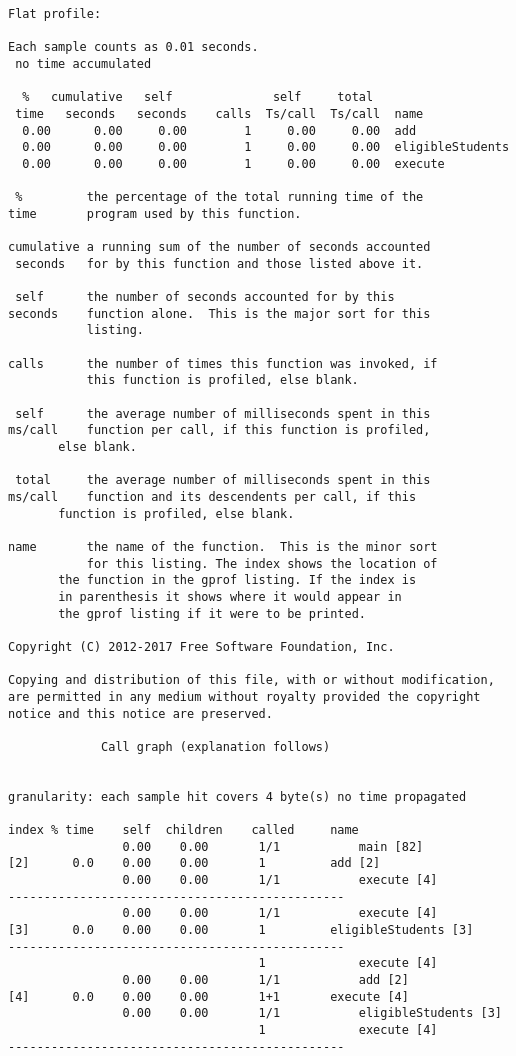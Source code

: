 \documentclass{report}
\begin{document}
\begin{verbatim}
Flat profile:

Each sample counts as 0.01 seconds.
 no time accumulated

  %   cumulative   self              self     total           
 time   seconds   seconds    calls  Ts/call  Ts/call  name    
  0.00      0.00     0.00        1     0.00     0.00  add
  0.00      0.00     0.00        1     0.00     0.00  eligibleStudents
  0.00      0.00     0.00        1     0.00     0.00  execute

 %         the percentage of the total running time of the
time       program used by this function.

cumulative a running sum of the number of seconds accounted
 seconds   for by this function and those listed above it.

 self      the number of seconds accounted for by this
seconds    function alone.  This is the major sort for this
           listing.

calls      the number of times this function was invoked, if
           this function is profiled, else blank.

 self      the average number of milliseconds spent in this
ms/call    function per call, if this function is profiled,
	   else blank.

 total     the average number of milliseconds spent in this
ms/call    function and its descendents per call, if this
	   function is profiled, else blank.

name       the name of the function.  This is the minor sort
           for this listing. The index shows the location of
	   the function in the gprof listing. If the index is
	   in parenthesis it shows where it would appear in
	   the gprof listing if it were to be printed.

Copyright (C) 2012-2017 Free Software Foundation, Inc.

Copying and distribution of this file, with or without modification,
are permitted in any medium without royalty provided the copyright
notice and this notice are preserved.

		     Call graph (explanation follows)


granularity: each sample hit covers 4 byte(s) no time propagated

index % time    self  children    called     name
                0.00    0.00       1/1           main [82]
[2]      0.0    0.00    0.00       1         add [2]
                0.00    0.00       1/1           execute [4]
-----------------------------------------------
                0.00    0.00       1/1           execute [4]
[3]      0.0    0.00    0.00       1         eligibleStudents [3]
-----------------------------------------------
                                   1             execute [4]
                0.00    0.00       1/1           add [2]
[4]      0.0    0.00    0.00       1+1       execute [4]
                0.00    0.00       1/1           eligibleStudents [3]
                                   1             execute [4]
-----------------------------------------------


\end{verbatim}
\end{document}
